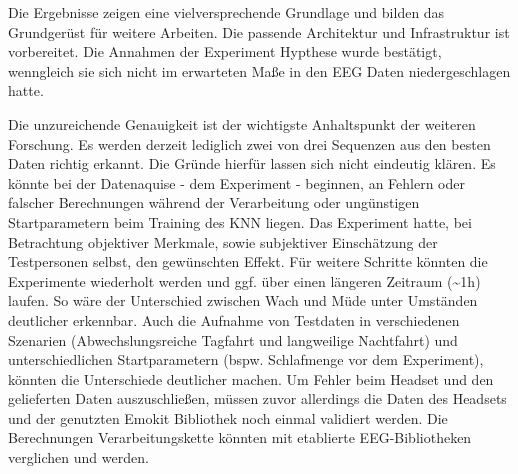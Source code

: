 \label{chap:conclusion}
Die Ergebnisse zeigen eine vielversprechende Grundlage und bilden das Grundgerüst für weitere Arbeiten. Die passende Architektur und Infrastruktur ist vorbereitet. Die Annahmen der Experiment Hypthese wurde bestätigt, wenngleich sie sich nicht im erwarteten Maße in den EEG Daten niedergeschlagen hatte.

Die unzureichende Genauigkeit ist der wichtigste Anhaltspunkt der weiteren Forschung. Es werden derzeit lediglich zwei von drei Sequenzen aus den besten Daten richtig erkannt. 
Die Gründe hierfür lassen sich nicht eindeutig klären. Es könnte bei der Datenaquise - dem Experiment - beginnen, an Fehlern oder falscher Berechnungen während der Verarbeitung oder ungünstigen Startparametern beim Training des KNN liegen. Das Experiment hatte, bei Betrachtung objektiver Merkmale, sowie subjektiver Einschätzung der Testpersonen selbst, den gewünschten Effekt. Für weitere Schritte könnten die Experimente wiederholt werden und ggf. über einen längeren Zeitraum (\textasciitilde 1h) laufen. So wäre der Unterschied zwischen Wach und Müde unter Umständen deutlicher erkennbar. Auch die Aufnahme von Testdaten in verschiedenen Szenarien (Abwechslungsreiche Tagfahrt und langweilige Nachtfahrt) und unterschiedlichen Startparametern (bspw. Schlafmenge vor dem Experiment), könnten die Unterschiede deutlicher machen.
Um Fehler beim Headset und den gelieferten Daten auszuschließen, 
müssen zuvor allerdings die Daten des Headsets und der genutzten Emokit Bibliothek noch einmal validiert werden.
Die Berechnungen Verarbeitungskette könnten mit etablierte EEG-Bibliotheken verglichen und werden. 